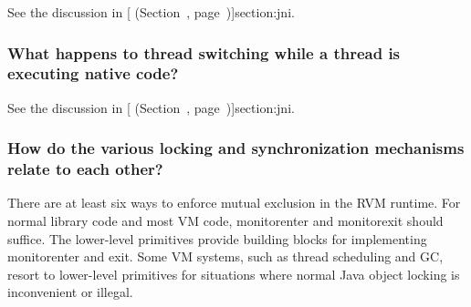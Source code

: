 See the discussion in [
  (Section~\Ref, page~\Pageref)]{section:jni}. 

\subsubsection{What happens to thread switching while a thread is
executing native code?}
See the discussion in [ (Section~\Ref, page~\Pageref)]{section:jni}. 

\subsubsection{How do the various locking and synchronization mechanisms
relate to each other?}

There are at least six ways to enforce mutual exclusion in the
RVM runtime.  For normal library code and most VM code, monitorenter and
monitorexit should suffice.  The lower-level primitives provide 
building blocks for implementing monitorenter and exit. Some VM systems,
such as thread scheduling and GC, resort to lower-level primitives for
situations where normal Java object locking is inconvenient or illegal.
